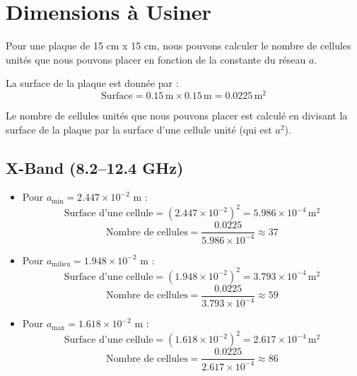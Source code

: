 \documentclass{article}
\begin{document}
\section{Dimensions à Usiner}
Pour une plaque de 15 cm x 15 cm, nous pouvons calculer le nombre de cellules unités que nous pouvons placer en fonction de la constante du réseau \( a \).

La surface de la plaque est donnée par :
\[
\text{Surface} = 0.15 \, \text{m} \times 0.15 \, \text{m} = 0.0225 \, \text{m}^2
\]

Le nombre de cellules unités que nous pouvons placer est calculé en divisant la surface de la plaque par la surface d'une cellule unité (qui est \( a^2 \)).

\subsection{X-Band (8.2–12.4 GHz)}
\begin{itemize}
    \item Pour \( a_{\text{min}} = 2.447 \times 10^{-2} \) m :
    \[
    \text{Surface d'une cellule} = (2.447 \times 10^{-2})^2 = 5.986 \times 10^{-4} \, \text{m}^2
    \]
    \[
    \text{Nombre de cellules} = \frac{0.0225}{5.986 \times 10^{-4}} \approx 37
    \]

    \item Pour \( a_{\text{milieu}} = 1.948 \times 10^{-2} \) m :
    \[
    \text{Surface d'une cellule} = (1.948 \times 10^{-2})^2 = 3.793 \times 10^{-4} \, \text{m}^2
    \]
    \[
    \text{Nombre de cellules} = \frac{0.0225}{3.793 \times 10^{-4}} \approx 59
    \]

    \item Pour \( a_{\text{max}} = 1.618 \times 10^{-2} \) m :
    \[
    \text{Surface d'une cellule} = (1.618 \times 10^{-2})^2 = 2.617 \times 10^{-4} \, \text{m}^2
    \]
    \[
    \text{Nombre de cellules} = \frac{0.0225}{2.617 \times 10^{-4}} \approx 86
    \]
\end{itemize}
\end{document}
